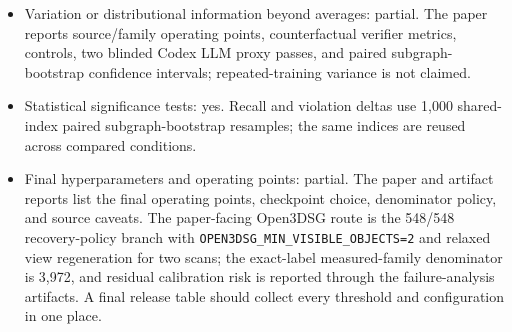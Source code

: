 \begin{itemize}
    \item Variation or distributional information beyond averages: partial.
    The paper reports source/family operating points, counterfactual verifier
    metrics, controls, two blinded Codex LLM proxy passes, and paired
    subgraph-bootstrap confidence intervals; repeated-training variance is not
    claimed.
    \item Statistical significance tests: yes. Recall and violation deltas
    use 1,000 shared-index paired subgraph-bootstrap resamples; the same indices
    are reused across compared conditions.
    \item Final hyperparameters and operating points: partial. The paper and
    artifact reports list the final operating points, checkpoint choice,
    denominator policy, and source caveats. The paper-facing Open3DSG route is
    the 548/548 recovery-policy branch with
    \texttt{OPEN3DSG\_MIN\_VISIBLE\_OBJECTS=2} and relaxed view regeneration
    for two scans; the exact-label measured-family denominator is 3,972, and residual
    calibration risk is reported through the failure-analysis artifacts. A
    final release table should collect every threshold and configuration in one
    place.
\end{itemize}
